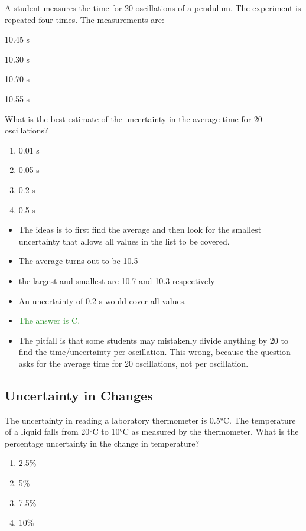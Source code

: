 \documentclass[a4paper,12pt]{article}
\let\oldsubsection\subsection
\renewcommand\subsection{\clearpage\oldsubsection}
\newcommand{\ans}[1]{\textcolor{ForestGreen}{The answer is #1.}}
\begin{document}
A student measures the time for 20 oscillations of a pendulum. The experiment is repeated four times. The measurements are:

\begin{center}
  10.45 s

  10.30 s

  10.70 s

  10.55 s
\end{center}

What is the best estimate of the uncertainty in the average time for 20 oscillations?

\begin{enumerate}[label=\Alph*.]
  \item 0.01 s
  \item 0.05 s
  \item 0.2 s
  \item 0.5 s
\end{enumerate}

\begin{itemize}
  \item The ideas is to first find the average and then look for the smallest uncertainty that allows all values in the list to be covered.
  \item The average turns out to be 10.5
  \item the largest and smallest are 10.7 and 10.3 respectively
  \item An uncertainty of 0.2 s would cover all values.
  \item \ans{C}
  \item The pitfall is that some students may mistakenly divide anything by 20 to find the time/uncertainty per oscillation. This wrong, because the question asks for the average time for 20 oscillations, not per oscillation.
\end{itemize}

\subsection{Uncertainty in Changes}

The uncertainty in reading a laboratory thermometer is 0.5°C. The temperature of a liquid falls from 20°C to 10°C as measured by the thermometer. What is the percentage uncertainty in the change in temperature?

\begin{enumerate}[label=\Alph*.]
  \item 2.5\%
  \item 5\%
  \item 7.5\%
  \item 10\%
\end{enumerate}
\end{document}
